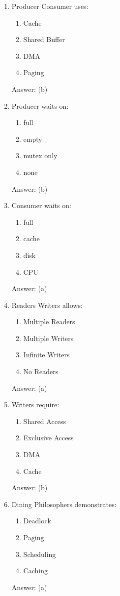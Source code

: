 \begin{enumerate}
\item Producer Consumer uses:
\begin{enumerate}[label=(\alph*)]
\item Cache
\item Shared Buffer
\item DMA
\item Paging
\end{enumerate}
Answer: (b)

\item Producer waits on:
\begin{enumerate}[label=(\alph*)]
\item full
\item empty
\item mutex only
\item none
\end{enumerate}
Answer: (b)

\item Consumer waits on:
\begin{enumerate}[label=(\alph*)]
\item full
\item cache
\item disk
\item CPU
\end{enumerate}
Answer: (a)

\item Readers Writers allows:
\begin{enumerate}[label=(\alph*)]
\item Multiple Readers
\item Multiple Writers
\item Infinite Writers
\item No Readers
\end{enumerate}
Answer: (a)

\item Writers require:
\begin{enumerate}[label=(\alph*)]
\item Shared Access
\item Exclusive Access
\item DMA
\item Cache
\end{enumerate}
Answer: (b)

\item Dining Philosophers demonstrates:
\begin{enumerate}[label=(\alph*)]
\item Deadlock
\item Paging
\item Scheduling
\item Caching
\end{enumerate}
Answer: (a)


\end{enumerate}

